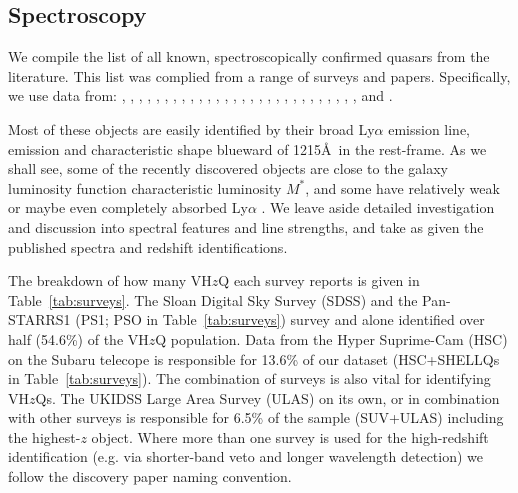 \documentclass[usenatbib]{mnras}
\begin{document}
\subsection{Spectroscopy} 
We compile the list of all known, spectroscopically confirmed
quasars from the literature.  This list was complied from a range of
surveys and papers.  Specifically, we use data from:
\citet{Banados2014, Banados2016, Banados2018}, 
\citet{Becker2015}, 
\citet{Calura2014}, 
\citet{Carilli2007, Carilli2010}, 
\citet{Carnall2015}, 
\citet{Cool2006}, 
\citet{DeRosa2011}, 
\citet{Fan2000, Fan2001c, Fan2003, Fan2004, Fan2006, Fan2018}, 
\citet{Goto2006}, 
\citet{Ikeda2017}, 
\citet{Jiang2008, Jiang2009, Jiang2015, Jiang2016},   
\citet{Kashikawa2015}, 
\citet{Koptelova2017}, 
\citet{Kim2015, Kim2018},  
\citet{Kurk2007, Kurk2009}, 
\citet{Leipski2014}, 
\citet{Mahabal2005}, 
\citet{Matsuoka2016,  Matsuoka2018a, Matsuoka2018b},   
\citet{Mazzucchelli2017}, 
\citet{Morganson2012}, 
\citet{Mortlock2009, Mortlock2011},
\citet{McGreer2006, McGreer2013},  
\citet{Reed2015, Reed2017}, 
\citet{Stern2007},  
\citet{Tang2017}, 
\citet{Venemans2007, Venemans2012, Venemans2013, Venemans2015a, Venemans2015b, Venemans2016},
\citet{WangF2016, WangF2017, WangF2018a, WangF2018b},
\citet{Willott2007, Willott2009, Willott2010a, Willott2013b, Willott2015}, 
\citet{Wu2015} 
\citet{YangJ2018a, YangJ2018b}  
and 
\citet{Zeimann2011}. 

Most of these objects are easily identified by their broad Ly$\alpha$ emission line, \nv emission and characteristic shape blueward of 1215\AA\ in the rest-frame. As we shall see, some of the recently discovered objects are close to the galaxy luminosity function characteristic luminosity $M^{*}$, and some have relatively weak or maybe even completely absorbed Ly$\alpha$ \citep[e.g. Figures 7 and 10 in][]{Banados2016}. We leave aside detailed investigation and discussion into spectral features and line strengths, and take as given the published spectra and redshift identifications.

The breakdown of how many VH$z$Q each survey reports is given in Table~\ref{tab:surveys}. The Sloan Digital Sky Survey (SDSS) and the Pan-STARRS1 (PS1; PSO in Table~\ref{tab:surveys}) survey and alone identified over half (54.6\%) of the VH$z$Q population. Data from the Hyper Suprime-Cam (HSC) on the Subaru telecope is responsible for 13.6\% of our dataset (HSC+SHELLQs in Table~\ref{tab:surveys}). The combination of surveys is also vital for identifying VH$z$Qs. The UKIDSS Large Area Survey (ULAS) on its own, or in combination with other surveys is responsible for 6.5\% of the sample (SUV+ULAS) including the highest-$z$ object. Where more than one survey is used for the high-redshift identification (e.g. via shorter-band veto and longer wavelength detection) we follow the discovery paper naming convention.
\end{document}
